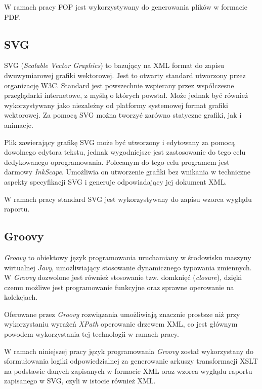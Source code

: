 \documentclass[11pt,a4paper]{article}
\begin{document}
W ramach pracy FOP jest wykorzystywany do generowania plików w formacie PDF.

\subsection{SVG} \label{tools:svg}
SVG (\emph{Scalable Vector Graphics}) to bazujący na XML format do zapisu dwuwymiarowej grafiki wektorowej. Jest to otwarty standard utworzony przez organizację W3C. Standard jest powszechnie wspierany przez współczesne przeglądarki internetowe, z myślą o których powstał. Może jednak być również wykorzystywany jako niezależny od platformy systemowej format grafiki wektorowej. Za pomocą SVG można tworzyć zarówno statyczne grafiki, jak i animacje.

Plik zawierający grafikę SVG może być utworzony i edytowany za pomocą dowolnego edytora tekstu, jednak wygodniejsze jest zastosowanie do tego celu dedykowanego oprogramowania. Polecanym do tego celu programem jest darmowy \emph{InkScape}. Umożliwia on utworzenie grafiki bez wnikania w techniczne aspekty specyfikacji SVG i generuje odpowiadający jej dokument XML.

W ramach pracy standard SVG jest wykorzystywany do zapisu wzorca wyglądu raportu. 

\subsection{Groovy} \label{tools:groovy}
\emph{Groovy} to obiektowy język programowania uruchamiany w środowisku maszyny wirtualnej \emph{Javy}, umożliwiający stosowanie dynamicznego typowania zmiennych. W \emph{Groovy} dozwolone jest również stosowanie tzw. domknięć (\emph{closure}), dzięki czemu możliwe jest programowanie funkcyjne oraz sprawne operowanie na kolekcjach. 

Oferowane przez \emph{Groovy} rozwiązania umożliwiają znacznie prostsze niż przy wykorzystaniu wyrażeń \emph{XPath} operowanie drzewem XML, co jest głównym powodem wykorzystania tej technologii w ramach pracy.

W ramach niniejszej pracy język programowania \emph{Groovy} został wykorzystany do sformułowania logiki odpowiedzialnej za generowanie arkuszy transformacji XSLT na podstawie danych zapisanych w formacie XML oraz wzorca wyglądu raportu zapisanego w SVG, czyli w istocie również XML. 
\end{document}
